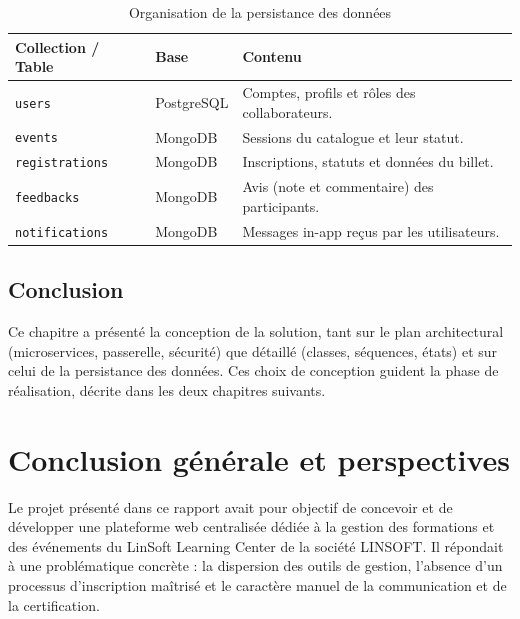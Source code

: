 \documentclass[12pt,a4paper,oneside]{report}
\begin{document}
\begin{table}[H]\centering\renewcommand{\arraystretch}{1.3}
\begin{tabular}{|p{3.6cm}|p{3.2cm}|p{6.4cm}|}\hline
\rowcolor{gray!15}\textbf{Collection / Table} & \textbf{Base} & \textbf{Contenu} \\ \hline
\texttt{users} & PostgreSQL & Comptes, profils et rôles des collaborateurs. \\ \hline
\texttt{events} & MongoDB & Sessions du catalogue et leur statut. \\ \hline
\texttt{registrations} & MongoDB & Inscriptions, statuts et données du billet. \\ \hline
\texttt{feedbacks} & MongoDB & Avis (note et commentaire) des participants. \\ \hline
\texttt{notifications} & MongoDB & Messages in-app reçus par les utilisateurs. \\ \hline
\end{tabular}
\caption{Organisation de la persistance des données}\label{tab:db}
\end{table}

\section*{Conclusion}
Ce chapitre a présenté la conception de la solution, tant sur le plan architectural
(microservices, passerelle, sécurité) que détaillé (classes, séquences, états) et sur celui de
la persistance des données. Ces choix de conception guident la phase de réalisation, décrite
dans les deux chapitres suivants.
\clearpage




\chapter*{Conclusion générale et perspectives}

Le projet présenté dans ce rapport avait pour objectif de concevoir et de développer une
plateforme web centralisée dédiée à la gestion des formations et des événements du LinSoft
Learning Center de la société LINSOFT. Il répondait à une problématique concrète : la
dispersion des outils de gestion, l'absence d'un processus d'inscription maîtrisé et le
caractère manuel de la communication et de la certification.
\end{document}
